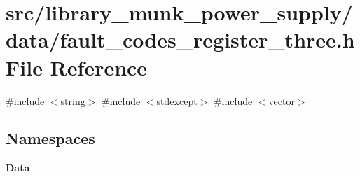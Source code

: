 \section{src/library\+\_\+munk\+\_\+power\+\_\+supply/data/fault\+\_\+codes\+\_\+register\+\_\+three.h File Reference}
\label{fault__codes__register__three_8h}
{\ttfamily \#include $<$string$>$}\newline
{\ttfamily \#include $<$stdexcept$>$}\newline
{\ttfamily \#include $<$vector$>$}\newline
\subsection*{Namespaces}
\begin{DoxyCompactItemize}
\item 
 \textbf{ Data}
\end{DoxyCompactItemize}

